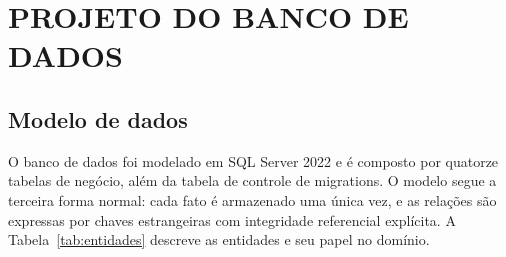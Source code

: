 \section{PROJETO DO BANCO DE DADOS}

\subsection{Modelo de dados}

O banco de dados foi modelado em SQL Server 2022 e é composto por quatorze
tabelas de negócio, além da tabela de controle de migrations. O modelo segue a
terceira forma normal: cada fato é armazenado uma única vez, e as relações são
expressas por chaves estrangeiras com integridade referencial explícita. A
Tabela~\ref{tab:entidades} descreve as entidades e seu papel no domínio.

